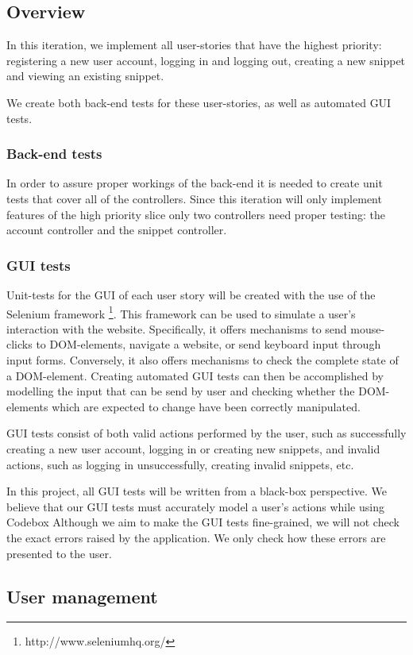 \documentclass[10pt,a4paper,BCOR12mm, headexclude, footexclude,
  twoside, openright]{scrartcl}
\numberwithin{equation}{section} %
\numberwithin{figure}{section} %
\numberwithin{table}{section} %
\begin{document}
\subsection{Overview}
In this iteration, we implement all user-stories that have the highest priority: registering a new user account, logging in and logging out, creating a new snippet and viewing an existing snippet.

We create both back-end tests for these user-stories, as well as automated GUI tests.

\subsubsection*{Back-end tests}
In order to assure proper workings of the back-end it is needed to create unit tests that cover all of the controllers.
Since this iteration will only implement features of the high priority slice only two controllers need proper testing: the account controller and the snippet controller.

\subsubsection*{GUI tests}
Unit-tests for the GUI of each user story will be created with the use of the Selenium framework \footnote{http://www.seleniumhq.org/}.
This framework can be used to simulate a user's interaction with the website. Specifically, it offers mechanisms to send mouse-clicks to DOM-elements, navigate a website, or send keyboard input through input forms.
Conversely, it also offers mechanisms to check the complete state of a DOM-element.
Creating automated GUI tests can then be accomplished by modelling the input that can be send by user and checking whether the DOM-elements which are expected to change have been correctly manipulated.

GUI tests consist of both valid actions performed by the user, such as successfully creating a new user account, logging in or creating new snippets, and invalid actions, such as logging in unsuccessfully, creating invalid snippets, etc.

In this project, all GUI tests will be written from a black-box perspective.
We believe that our GUI tests must accurately model a user's actions while using Codebox
 Although we aim to make the GUI tests fine-grained, we will not check the exact errors raised by the application. We only check how these errors are presented to the user.

\subsection{User management}
\end{document}
